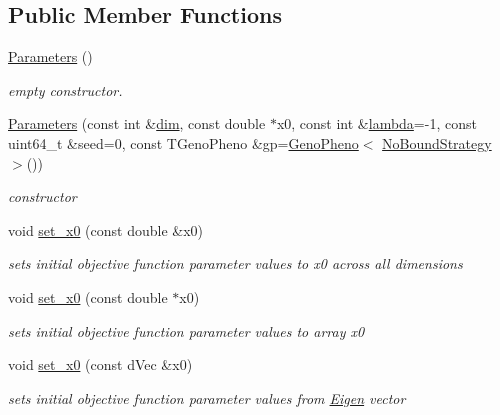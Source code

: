 \subsection*{Public Member Functions}
\begin{DoxyCompactItemize}
\item 
\hypertarget{classlibcmaes_1_1Parameters_a680f96c102aa0cb4c9e8d39b515392b9}{\hyperlink{classlibcmaes_1_1Parameters_a680f96c102aa0cb4c9e8d39b515392b9}{Parameters} ()}\label{classlibcmaes_1_1Parameters_a680f96c102aa0cb4c9e8d39b515392b9}

\begin{DoxyCompactList}\small\item\em empty constructor. \end{DoxyCompactList}\item 
\hyperlink{classlibcmaes_1_1Parameters_a082cedda8396793496e8d796bc0184b2}{Parameters} (const int \&\hyperlink{classlibcmaes_1_1Parameters_a95a3c04400a77d134bb1e9705189a24e}{dim}, const double $\ast$x0, const int \&\hyperlink{classlibcmaes_1_1Parameters_a3d569987e9a5eb61bc781ee75b2ab18a}{lambda}=-\/1, const uint64\+\_\+t \&seed=0, const T\+Geno\+Pheno \&gp=\hyperlink{classlibcmaes_1_1GenoPheno}{Geno\+Pheno}$<$ \hyperlink{classlibcmaes_1_1NoBoundStrategy}{No\+Bound\+Strategy} $>$())
\begin{DoxyCompactList}\small\item\em constructor \end{DoxyCompactList}\item 
void \hyperlink{classlibcmaes_1_1Parameters_a61660152146a78000b5cc59a0298a8f0}{set\+\_\+x0} (const double \&x0)
\begin{DoxyCompactList}\small\item\em sets initial objective function parameter values to x0 across all dimensions \end{DoxyCompactList}\item 
void \hyperlink{classlibcmaes_1_1Parameters_a50056ec90bc1b89295f8363eb566b8ce}{set\+\_\+x0} (const double $\ast$x0)
\begin{DoxyCompactList}\small\item\em sets initial objective function parameter values to array x0 \end{DoxyCompactList}\item 
void \hyperlink{classlibcmaes_1_1Parameters_a77985cc81f856083a63d85ebc11db0ae}{set\+\_\+x0} (const d\+Vec \&x0)
\begin{DoxyCompactList}\small\item\em sets initial objective function parameter values from \hyperlink{namespaceEigen}{Eigen} vector \end{DoxyCompactList}\item 

\end{DoxyCompactItemize}
